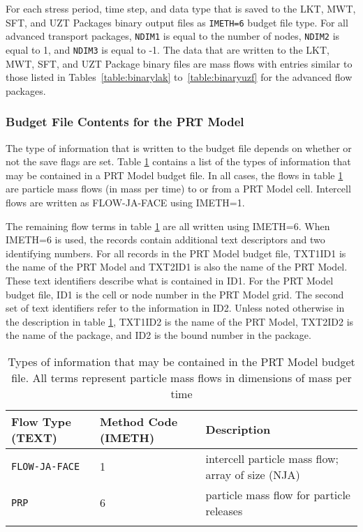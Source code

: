 \vspace{5mm}
For each stress period, time step, and data type that is saved to the LKT, MWT, SFT, and UZT Packages binary output files as \texttt{IMETH=6} budget file type. For all advanced transport packages, \texttt{NDIM1} is equal to the number of nodes, \texttt{NDIM2} is equal to 1, and \texttt{NDIM3} is equal to -1. The data that are written to the LKT, MWT, SFT, and UZT Package binary files are mass flows with entries similar to those listed in Tables~\ref{table:binarylak} to~\ref{table:binaryuzf} for the advanced flow packages.


\newpage
\subsubsection{Budget File Contents for the PRT Model}

The type of information that is written to the budget file depends on whether or not the save flags are set.  Table \ref{table:prtbud} contains a list of the types of information that may be contained in a PRT Model budget file.  In all cases, the flows in table \ref{table:prtbud} are particle mass flows (in mass per time) to or from a PRT Model cell.  Intercell flows are written as FLOW-JA-FACE using IMETH=1.

The remaining flow terms in table \ref{table:prtbud} are all written using IMETH=6.  When IMETH=6 is used, the records contain additional text descriptors and two identifying numbers.  For all records in the PRT Model budget file, TXT1ID1 is the name of the PRT Model and TXT2ID1 is also the name of the PRT Model.  These text identifiers describe what is contained in ID1.  For the PRT Model budget file, ID1 is the cell or node number in the PRT Model grid.  The second set of text identifiers refer to the information in ID2.  Unless noted otherwise in the description in table \ref{table:prtbud}, TXT1ID2 is the name of the PRT Model, TXT2ID2 is the name of the package, and ID2 is the bound number in the package.

\begin{longtable}{p{3.5cm} p{2cm} p{9cm}}
\caption{Types of information that may be contained in the PRT Model budget file.  All terms represent particle mass flows in dimensions of mass per time} 
\tabularnewline
\hline
\textbf{Flow Type (TEXT)} & \textbf{Method Code (IMETH)} & \textbf{Description} \\
\hline
\endhead
\hline
\endfoot
\texttt{FLOW-JA-FACE} & 1 & intercell particle mass flow; array of size (NJA) \\
\texttt{PRP} & 6 & particle mass flow for particle releases \\
\label{table:prtbud}
\end{longtable}


